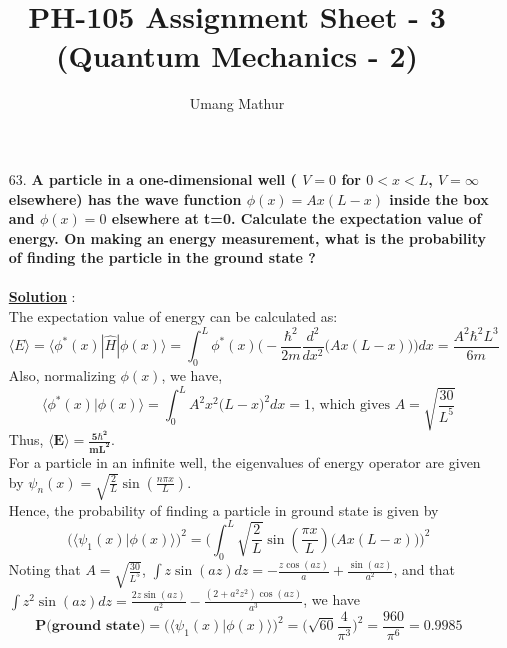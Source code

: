\documentclass[10pt, a4paper]{article}
\begin{document}
	\title{PH-105 Assignment Sheet - 3 (Quantum Mechanics - 2)}
	\date{}
	\author{Umang Mathur}
	\maketitle
	\begin{enumerate}
		\item[63.] {\bf A particle in a one-dimensional well ( $V=0$ for $0<x<L$, $V=\infty$ elsewhere) has the wave function $\phi(x) = Ax(L-x)$ inside the box and $\phi(x) = 0$ elsewhere at t=0. Calculate the expectation value of energy. On making an energy measurement, what is the probability of finding the particle in the ground state ? }\\\\
		{\underline {\bf Solution}} :\\
		The expectation value of energy can be calculated as:
		\[\langle E\rangle = \langle \phi^*(x) | \hat{H}| \phi(x) \rangle = \int_0^L \phi^*(x)\Big(-\frac{\hbar^2}{2m}\frac{d^2}{dx^2}\big(Ax(L-x)\big)\Big) dx = \frac{A^2\hbar^2L^3}{6m}\]
		Also, normalizing $\phi(x)$, we have,
		\[ \langle \phi^*(x) | \phi(x) \rangle = \int_0^L A^2x^2\big(L-x\big)^2 dx = 1 \text{, which gives } A = \sqrt{\frac{30}{L^5}}\]
		Thus, $\mathbf{\langle E\rangle = \frac{5\hbar^2}{mL^2}}$.\\
		For a particle in an infinite well, the eigenvalues of energy operator are given by $\psi_n(x) = \sqrt{\frac{2}{L}}\sin(\frac{n\pi x}{L})$.\\
		Hence, the probability of finding a particle in ground state is given by
		\[\big(\langle \psi_1(x) | \phi(x) \rangle\big)^2 = \Big(\int_0^L \sqrt{\frac{2}{L}}\sin(\frac{\pi x}{L})\big(Ax(L-x)\big) \Big)^2\]
		Noting that $A = \sqrt{\frac{30}{L^5}}$, $\int z\sin(az) dz = -\frac{z\cos(az)}{a} + \frac{\sin(az)}{a^2}$, and that $\int z^2\sin(az) dz = \frac{2z\sin(az)}{a^2} - \frac{(2 +  a^2z^2)\cos(az)}{a^3}$, we have
		\[ \textbf{P(ground state)} = \big(\langle \psi_1(x) | \phi(x) \rangle\big)^2 = \Big(\sqrt{60}\frac{4}{\pi^3}\Big)^2 = \frac{960}{\pi^6} = 0.9985\]
	\end{enumerate}
\end{document}
